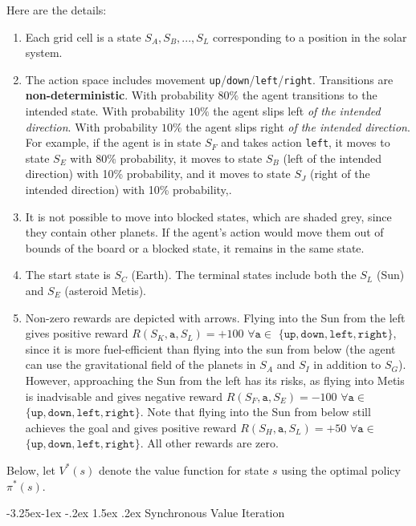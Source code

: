 \documentclass[11pt,addpoints,answers]{exam}
\makeatletter
\newcommand\subsectionquestion{%
  \@startsection{subsection}{2}
  {-2pc}%
  {-3.25ex\@plus -1ex \@minus -.2ex}%
  {1.5ex \@plus .2ex}%
  {\normalfont\large\bfseries}}
\makeatother
\begin{document}
\begin{questions}
Here are the details:

\begin{enumerate}
    \item Each grid cell is a state $S_A, S_B,..., S_L$ corresponding to a position in the solar system.
    \item The action space includes movement \texttt{up}/\texttt{down}/\texttt{left}/\texttt{right}. Transitions are \textbf{non-deterministic}. With probability $80\%$ the agent transitions to the intended state. With probability $10\%$ the agent slips left \emph{of the intended direction}. With probability $10\%$ the agent slips right \emph{of the intended direction}. For example, if the agent is in state $S_F$ and takes action \texttt{left},  it moves to state $S_E$ with 80\% probability, it moves to state $S_B$ (left of the intended direction) with 10\% probability, and it moves to state $S_J$ (right of the intended direction)  with 10\% probability,.
    \item It is not possible to move into blocked states, which are shaded grey, since they contain other planets. If the agent's action would move them out of bounds of the board or a blocked state, it remains in the same state.
    \item The start state is $S_C$ (Earth). The terminal states include both the $S_L$ (Sun) and $S_E$ (asteroid Metis).
    \item Non-zero rewards are depicted with arrows.  Flying into the Sun from the left gives positive reward $R(S_K, \texttt{a}, S_L) = +100$ $\forall \texttt{a} \in$ $\{\texttt{up},\texttt{down},\texttt{left},\texttt{right}\}$, since it is more fuel-efficient than flying into the sun from below (the agent can use the gravitational field of the planets in $S_A$ and $S_I$ in addition to $S_G$). However, approaching the Sun from the left has its risks, as flying into Metis is inadvisable and gives negative reward $R(S_F, \texttt{a}, S_E) = -100$ $\forall \texttt{a} \in$ $\{\texttt{up},\texttt{down},\texttt{left},\texttt{right}\}$. Note that flying into the Sun from below still achieves the goal and gives positive reward $R(S_H, \texttt{a}, S_L) = +50$ $\forall \texttt{a} \in$ $\{\texttt{up},\texttt{down},\texttt{left},\texttt{right}\}$. All other rewards are zero. 
\end{enumerate}

    
Below, let $V^*(s)$ denote the value function for state $s$ using the optimal policy $\pi^*(s)$.

\subsectionquestion{Synchronous Value Iteration}


\end{questions}
\end{document}
